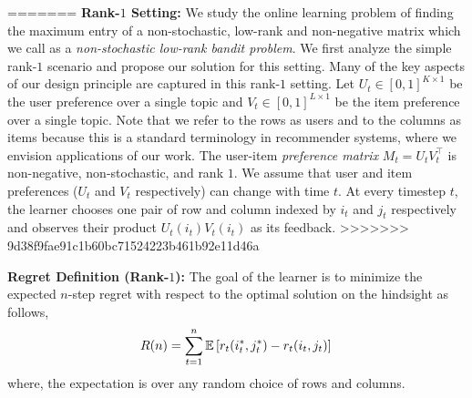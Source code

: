 =======
\textbf{Rank-$1$ Setting:} We study the online learning problem of finding the maximum entry of a non-stochastic, low-rank and non-negative matrix  which we call as a \emph{non-stochastic low-rank bandit problem}. We first analyze the simple rank-$1$ scenario and propose our solution for this setting. Many of the key aspects of our design principle are captured in this rank-$1$ setting. Let $U_t\in [0,1]^{K\times 1}$ be the user preference over a single topic and $V_t \in [0,1]^{L\times 1}$ be the item preference over a single topic. Note that we refer to the rows as users and to the columns as items because this is a standard terminology in recommender systems, where we envision applications of our work. The user-item \emph{preference matrix} $M_t = U_tV_t^{\intercal}$ is non-negative, non-stochastic, and rank $1$. We assume that user and item preferences ($U_t$ and $V_t$ respectively) can change with time $t$.  At every timestep  $t$, the learner chooses one pair of row and column indexed by $i_t$ and $j_t$ respectively and observes their product $U_t(i_t)V_t(i_t)$ as its feedback.
>>>>>>> 9d38f9fae91c1b60bc71524223b461b92e11d46a

\textbf{Regret Definition (Rank-$1$):} The goal of the learner is to minimize the expected $n$-step regret with respect to the optimal solution on the hindsight as follows,
\begin{align}
  R(n) =
  \sum_{t = 1}^n \mathbb{E}\left[r_t(i^\ast_t, j^\ast_t) - r_t(i_t,j_t)\right]\,
  \label{eq:regret}
\end{align}
where, the expectation is over any random choice of rows and columns. 



